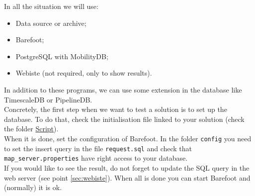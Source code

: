 \documentclass[a4paper,12pt]{article}
\begin{document}
    In all the situation we will use:
    \begin{itemize}
        \item Data source or archive;
        \item Barefoot;
        \item PostgreSQL with MobilityDB;
        \item Webiste (not required, only to show results).
    \end{itemize}
    In addition to these programs, we can use some extension in the database like TimescaleDB or PipelineDB.\\
    
    Concretely, the first step when we want to test a solution is to set up the database. To do that, check the initialisation file linked to your solution (check the folder \href{https://github.com/detobel36/MobilityDBComparison/tree/master/Script}{Script}).\\
    When it is done, set the configuration of Barefoot. In the folder \verb|config| you need to set the insert query in the file \verb|request.sql| and check that \verb|map_server.properties| have right access to your database.\\
    
    If you would like to see the result, do not forget to update the SQL query in the web server (see point \ref{sec:webiste}). When all is done you can start Barefoot and (normally) it is ok.
    
\end{document}
